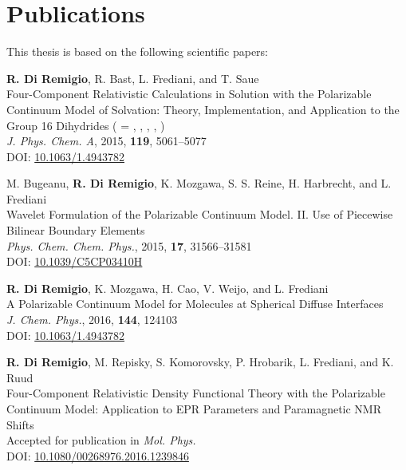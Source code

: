 \thispagestyle{empty}
{}

\chapter*{Publications}

This thesis is based on the following scientific papers:

\renewcommand{\descriptionlabel}[1]{\hspace*{\labelsep}#1}
\begin{description}[leftmargin=2mm, style=nextline]
\item[\paper{I}]
  \textbf{R. Di Remigio}, R. Bast, L. Frediani, and T. Saue
  \\
  \textsf{
  Four-Component Relativistic Calculations in Solution with the
  Polarizable Continuum Model of Solvation: Theory,
  Implementation, and Application to the Group 16 Dihydrides
   ( = , , , ,
  )
  }
  \\
\textit{J. Phys. Chem. A}, \textrm{2015}, \textbf{119}, 5061--5077
  \\
  DOI: \url{10.1063/1.4943782}
\label{relapcm}

\item[\paper{II}]
  M. Bugeanu, \textbf{R. Di Remigio}, K. Mozgawa, S. S. Reine, H.
  Harbrecht,  and L. Frediani
  \\
  \textsf{
  Wavelet Formulation of the Polarizable Continuum Model. II. Use of
  Piecewise Bilinear Boundary Elements
  }
  \\
  \textit{Phys. Chem. Chem. Phys.}, \textrm{2015}, \textbf{17},
  31566--31581
  \\
  DOI: \url{10.1039/C5CP03410H}
\label{wemlin}

\item[\paper{III}]
  \textbf{R. Di Remigio}, K. Mozgawa, H. Cao, V. Weijo, and L.
  Frediani
  \\
  \textsf{
  A Polarizable Continuum Model for Molecules at Spherical
  Diffuse Interfaces
  }
  \\
  \textit{J. Chem. Phys.}, \textrm{2016}, \textbf{144}, 124103
  \\
  DOI: \url{10.1063/1.4943782}
\label{spherical}

\item[\paper{IV}]
  \textbf{R. Di Remigio}, M. Repisky, S. Komorovsky, P. Hrobarik, L.
  Frediani, and K. Ruud
  \\
  \textsf{
  Four-Component Relativistic Density Functional Theory with the
  Polarizable Continuum Model: Application to EPR Parameters
  and Paramagnetic NMR Shifts
  }
  \\
  Accepted for publication in \textit{Mol. Phys.}
  \\
  DOI: \url{10.1080/00268976.2016.1239846}
\label{pcmepr}


\end{description}
